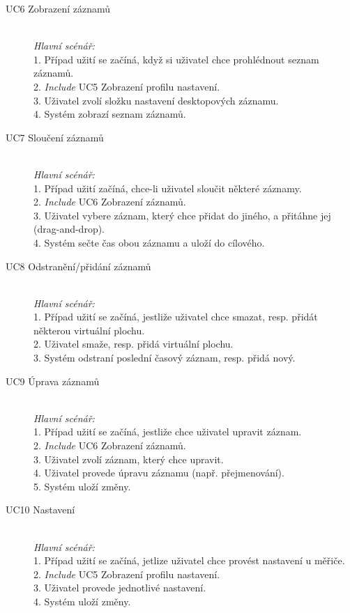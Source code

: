 \documentclass[thesis=B,czech]{FITthesis}[2012/06/26]
\begin{document}
\begin{description}
	
	\item[UC6 Zobrazení	záznamů] \hspace*{\fill} \\
	\textit{Hlavní scénář:}
	\\
	1. Případ užití se začíná, když si uživatel chce prohlédnout seznam záznamů. \\
	2. \textit{Include} UC5 Zobrazení profilu nastavení. \\
	3. Uživatel zvolí složku nastavení desktopových záznamu.\\ 
	4. Systém zobrazí seznam záznamů. 
	
	
	\item[UC7 Sloučení záznamů] \hspace*{\fill} \\
	\textit{Hlavní scénář:}
	\\
	1. Případ užití začíná, chce-li uživatel sloučit některé záznamy. \\
	2. \textit{Include} UC6 Zobrazení záznamů. \\
	3. Uživatel vybere záznam, který chce přidat do jiného, a přitáhne jej (drag-and-drop). \\
	4. Systém sečte čas obou záznamu a uloží do cílového.  
	
	\item[UC8 Odstranění/přidání záznamů] \hspace*{\fill} \\
	\textit{Hlavní scénář:}
	\\
	1. Případ užití se začíná, jestliže uživatel chce smazat, resp. přidát některou virtuální plochu. \\			
	2. Uživatel smaže, resp. přidá virtuální plochu.\\				
	3. Systém odstraní poslední časový záznam, resp. přidá nový. 
		
	\item[UC9 Úprava záznamů] \hspace*{\fill} \\
	\textit{Hlavní scénář:}
	\\	
	1. Případ užití se začíná, jestliže chce uživatel upravit záznam. \\		
	2. \textit{Include} UC6 Zobrazení záznamů. \\		
	3. Uživatel zvolí záznam, který chce upravit. \\		
	4. Uživatel provede úpravu záznamu (např. přejmenování).\\				
	5. Systém uloží změny.
	
	
	\item[UC10 Nastavení] \hspace*{\fill} \\
	\textit{Hlavní scénář:}
	\\
	1. Případ užití se začíná, jetlize uživatel chce provést nastavení u měřiče.\\		
	2. \textit{Include} UC5 Zobrazení profilu nastavení. \\		
	3. Uživatel provede jednotlivé nastavení. \\			
	4. Systém uloží změny. 
	

\end{description}
\end{document}
